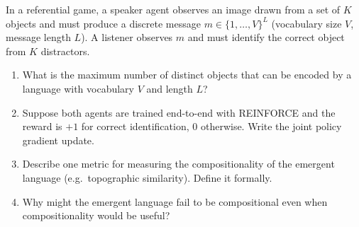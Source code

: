 \begin{exercise}
\label{ex:emergent-language}
In a referential game, a speaker agent observes an image drawn from
a set of $K$ objects and must produce a discrete message
$m \in \{1, \ldots, V\}^L$ (vocabulary size $V$, message length $L$).
A listener observes $m$ and must identify the correct object from $K$
distractors.
\begin{enumerate}[label=(\alph*)]
  \item What is the maximum number of distinct objects that can be
    encoded by a language with vocabulary $V$ and length $L$?
  \item Suppose both agents are trained end-to-end with REINFORCE
    and the reward is $+1$ for correct identification, $0$ otherwise.
    Write the joint policy gradient update.
  \item Describe one metric for measuring the compositionality of
    the emergent language (e.g.\ topographic similarity). Define it
    formally.
  \item Why might the emergent language fail to be compositional
    even when compositionality would be useful?
\end{enumerate}
\end{exercise}

